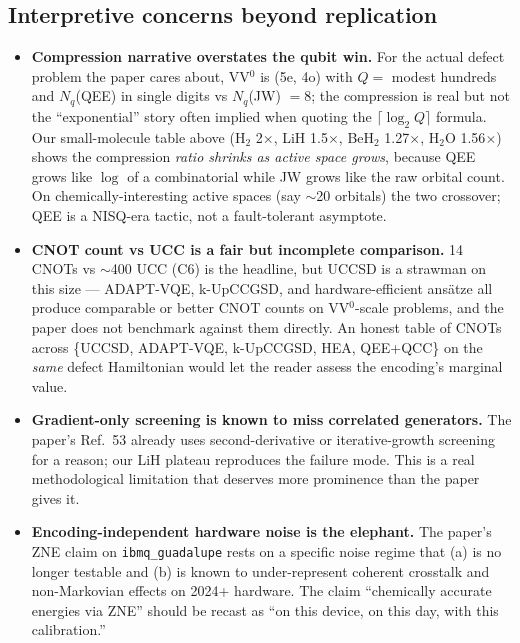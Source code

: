 \documentclass[11pt]{article}
\begin{document}
\subsection*{Interpretive concerns beyond replication}
\begin{itemize}\itemsep0.1em
\item \textbf{Compression narrative overstates the qubit win.} For the actual defect problem the paper cares about, VV$^0$ is (5e, 4o) with $Q=$ modest hundreds and $N_q$(QEE) in single digits vs $N_q$(JW) $= 8$; the compression is real but not the ``exponential'' story often implied when quoting the $\lceil\log_2 Q\rceil$ formula. Our small-molecule table above (H$_2$ 2$\times$, LiH 1.5$\times$, BeH$_2$ 1.27$\times$, H$_2$O 1.56$\times$) shows the compression \emph{ratio shrinks as active space grows}, because QEE grows like $\log$ of a combinatorial while JW grows like the raw orbital count. On chemically-interesting active spaces (say $\sim$20 orbitals) the two crossover; QEE is a NISQ-era tactic, not a fault-tolerant asymptote.
\item \textbf{CNOT count vs UCC is a fair but incomplete comparison.} 14 CNOTs vs $\sim$400 UCC (C6) is the headline, but UCCSD is a strawman on this size --- ADAPT-VQE, k-UpCCGSD, and hardware-efficient ans\"atze all produce comparable or better CNOT counts on VV$^0$-scale problems, and the paper does not benchmark against them directly. An honest table of CNOTs across \{UCCSD, ADAPT-VQE, k-UpCCGSD, HEA, QEE+QCC\} on the \emph{same} defect Hamiltonian would let the reader assess the encoding's marginal value.
\item \textbf{Gradient-only screening is known to miss correlated generators.} The paper's Ref.\ 53 already uses second-derivative or iterative-growth screening for a reason; our LiH plateau reproduces the failure mode. This is a real methodological limitation that deserves more prominence than the paper gives it.
\item \textbf{Encoding-independent hardware noise is the elephant.} The paper's ZNE claim on \texttt{ibmq\_guadalupe} rests on a specific noise regime that (a) is no longer testable and (b) is known to under-represent coherent crosstalk and non-Markovian effects on 2024+ hardware. The claim ``chemically accurate energies via ZNE'' should be recast as ``on this device, on this day, with this calibration.''
\end{itemize}
\end{document}
